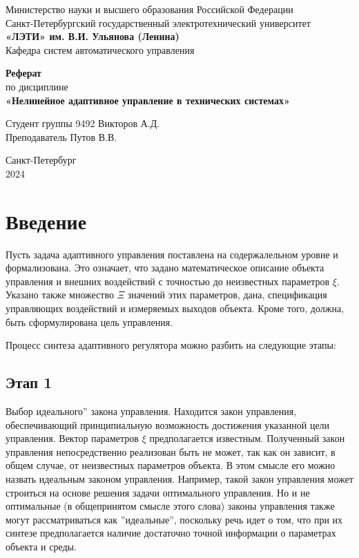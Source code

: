 \documentclass[a4paper,14pt]{extarticle} %
\begin{document}
\begin{titlepage}
    \begin{center}
        \large
        Министерство науки и высшего образования Российской Федерации \\
        Санкт-Петербургский государственный электротехнический университет \\
        \textbf{«ЛЭТИ» им. В.И. Ульянова (Ленина)} \\
        Кафедра систем автоматического управления

        \vfill

        \textbf{Реферат} \\
        по дисциплине \\
        \textbf{«Нелинейное адаптивное управление в технических системах»}

        \vfill

        Студент группы 9492 \hfill Викторов А.Д. \\
        Преподаватель \hfill Путов В.В.

        \vfill
        Санкт-Петербург \\
        2024
    \end{center}
\end{titlepage}

\setcounter{page}{2}
\tableofcontents

\section{Введение}
Пусть задача адаптивного управления поставлена на содержалельном уровне и формализована. Это означает, что задано математическое описание объекта управления и внешних воздействий с точностью до неизвестных параметров $\xi$.
Указано также множество $\Xi$ значений этих параметров, дана,
спецификация управляющих воздействий и измеряемых выходов объекта. Кроме того, должна, быть сформулирована цель управления.

Процесс синтеза адаптивного регулятора можно разбить на следующие этапы:

\subsection{Этап 1} Выбор идеального” закона управления. Находится закон управления, обеспечивающий принципиальную возможность достижения указанной цели управления.
Вектор параметров $\xi$ предполагается известным. Полученный закон управления непосредственно реализован быть не может, так как он зависит, в общем случае, от неизвестных параметров объекта. В этом смысле его можно назвать идеальным законом управления. Например, такой закон управления может строиться на основе решения задачи оптимального управления. Но и не оптимальные (в общепринятом смысле этого слова) законы управления также могут рассматриваться как ”идеальные”, поскольку речь идет о том, что при их синтезе предполагается наличие достаточно точной информации о параметрах объекта и среды.
\end{document}
